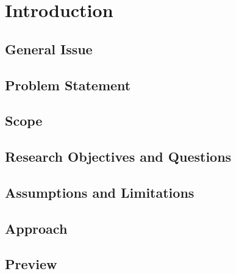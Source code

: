 \documentclass[12pt,letterpaper,oneside]{book}
\begin{document}
%
\frontmatter\flyleaf
    \disclaimerpage
    \titlepageAFIT
    \committeepage
    
    
    \tableofcontents
    \listoffigures
    \listoftables
    \listofabbreviations

\mainmatter
	\chapter{Introduction}
    \label{Intro}
    	\section{General Issue}
   		\label{geniss}
    	
    	
    	\section{Problem Statement}
   		\label{probst}
    	
    	
    	\section{Scope}
        \label{Scope}
        
        
    	\section{Research Objectives and Questions}
    	\label{ObjandQs}
        
        
        \section{Assumptions and Limitations}
        \label{Assums_Limits}
        
        
        \section{Approach}
        \label{Approach}
        
        
        \section{Preview}
        \label{preview}
        
\end{document}
